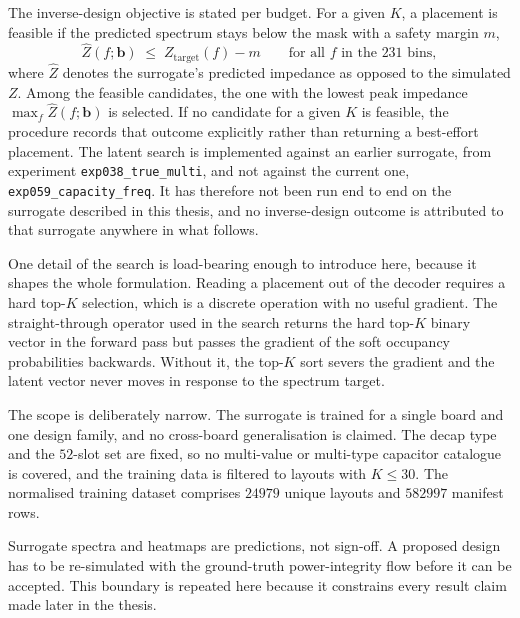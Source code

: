 The inverse-design objective is stated per budget. For a given $K$, a placement is feasible if the
predicted spectrum stays below the mask with a safety margin $m$,
%
\begin{equation}
  \hat{Z}(f; \mathbf{b}) \;\le\; Z_{\mathrm{target}}(f) - m
  \qquad \text{for all } f \text{ in the } 231 \text{ bins},
  \label{eq:feasibility_intro}
\end{equation}
%
where $\hat{Z}$ denotes the surrogate's predicted impedance as opposed to the simulated $Z$. Among
the feasible candidates, the one with the lowest peak impedance $\max_f \hat{Z}(f;\mathbf{b})$ is
selected. If no candidate for a given $K$ is feasible, the procedure records that outcome
explicitly rather than returning a best-effort placement. The latent search is implemented against
an earlier surrogate, from experiment \texttt{exp038\_true\_multi}, and not against the current one,
\texttt{exp059\_capacity\_freq}. It has therefore not been run end to end on the surrogate described
in this thesis, and no inverse-design outcome is attributed to that surrogate anywhere in what
follows.

One detail of the search is load-bearing enough to introduce here, because it shapes the whole
formulation. Reading a placement out of the decoder requires a hard top-$K$ selection, which is a
discrete operation with no useful gradient. The straight-through operator used in the search
returns the hard top-$K$ binary vector in the forward pass but passes the gradient of the soft
occupancy probabilities backwards. Without it, the top-$K$ sort severs the gradient and the latent
vector never moves in response to the spectrum target.

The scope is deliberately narrow. The surrogate is trained for a single board and one design
family, and no cross-board generalisation is claimed. The decap type and the $52$-slot set are
fixed, so no multi-value or multi-type capacitor catalogue is covered, and the training data is
filtered to layouts with $K \le 30$. The normalised training dataset comprises $24979$ unique
layouts and $582997$ manifest rows.

Surrogate spectra and heatmaps are predictions, not sign-off. A proposed design has to be
re-simulated with the ground-truth power-integrity flow before it can be accepted. This boundary
is repeated here because it constrains every result claim made later in the thesis.


